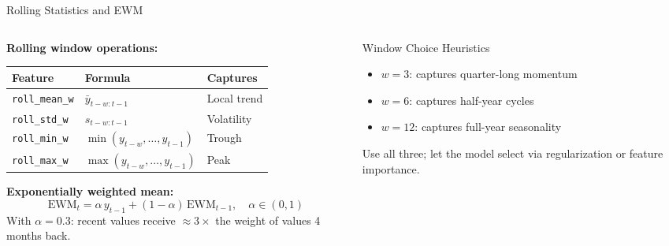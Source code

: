 \documentclass[aspectratio=169, 10pt]{beamer}
\begin{document}
\begin{frame}{Rolling Statistics and EWM}
  \begin{columns}[T]
    \begin{column}{0.52\textwidth}
      \textbf{Rolling window operations:}
      \begin{center}
      \footnotesize
      \begin{tabular}{lll}
        \toprule
        \textbf{Feature} & \textbf{Formula} & \textbf{Captures} \\
        \midrule
        \texttt{roll\_mean\_w} & $\bar{y}_{t-w:t-1}$
                               & Local trend \\
        \texttt{roll\_std\_w}  & $s_{t-w:t-1}$
                               & Volatility \\
        \texttt{roll\_min\_w}  & $\min(y_{t-w},\ldots,y_{t-1})$
                               & Trough \\
        \texttt{roll\_max\_w}  & $\max(y_{t-w},\ldots,y_{t-1})$
                               & Peak \\
        \bottomrule
      \end{tabular}
      \end{center}

      \medskip
      \textbf{Exponentially weighted mean:}
      \[
        \mathrm{EWM}_t
          = \alpha\, y_{t-1}
          + (1-\alpha)\,\mathrm{EWM}_{t-1},
          \quad \alpha \in (0,1)
      \]
      With $\alpha = 0.3$: recent values receive
      ${\approx}3\times$ the weight of values 4 months back.

      \smallskip
    \end{column}
    \begin{column}{0.44\textwidth}
      \begin{definitionbox}{Window Choice Heuristics}
        \footnotesize
        \begin{itemize}
          \item $w = 3$: captures quarter-long momentum
          \item $w = 6$: captures half-year cycles
          \item $w = 12$: captures full-year seasonality
        \end{itemize}
        Use all three; let the model select via
        regularization or feature importance.
      \end{definitionbox}


\end{column}
\end{columns}
\end{frame}
\end{document}
